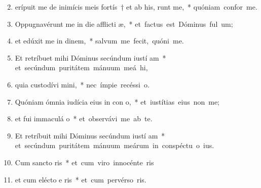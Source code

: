 \begin{flushleft}
\begin{enumerate}[leftmargin=*]
\setcounter{enumi}{1}

\item erípuit me de inimícis meis fortís~† et ab his,  runt me,~* \mbox{quóniam confor   me.}

\item Oppugnavérunt me in die afflicti æ,~* \mbox{et factus est Dóminus ful um;}

\item et edúxit me in dinem,~* \mbox{salvum me fecit, quóni  me.}

\item Et retríbuet mihi Dóminus secúndum iustí am~* \mbox{et secúndum puritátem mánuum meá  hi,}

\item quia custodívi  mini,~* \mbox{nec ímpie recéssi   o.}

\item Quóniam ómnia iudícia eius in con o,~* \mbox{et iustítias eius non   me;}

\item et fui immaculá  o~* \mbox{et observávi me ab te.}

\item Et retríbuit mihi Dóminus secúndum iustí am~* \mbox{et secúndum puritátem mánuum meárum in conspéctu o ius.}

\item Cum sancto  ris~* \mbox{et cum viro innocénte  ris}

\item et cum elécto e ris~* \mbox{et cum pervérso  ris.}


\end{enumerate}
\end{flushleft}

